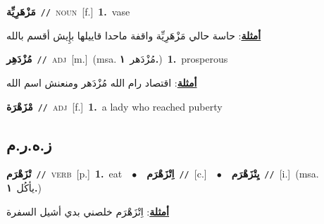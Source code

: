 \documentclass[10pt,a4paper,twoside]{article} %
\begin{document}
\begin{multicols}{2}
{\setlength\topsep{0pt}\textbf{\foreignlanguage{arabic}{مَزْهَرِيِّة}}\ {\color{gray}\texttt{//}\color{black}}\ \textsc{noun}\ [f.]\ \textbf{1.}~vase\  \begin{flushright}\color{gray}\foreignlanguage{arabic}{\textbf{\underline{\foreignlanguage{arabic}{أمثلة}}}: حاسة حالي مَزْهَرِيِّة واقفة ماحدا قاييلها بإِيش أقسم بالله}\end{flushright}\color{black}} \vspace{2mm}

{\setlength\topsep{0pt}\textbf{\foreignlanguage{arabic}{مُزْدَهِر}}\ {\color{gray}\texttt{//}\color{black}}\ \textsc{adj}\ [m.]\ \color{gray}(msa. \foreignlanguage{arabic}{مُزْدَهر}~\foreignlanguage{arabic}{\textbf{١.}})\color{black}\ \textbf{1.}~prosperous\  \begin{flushright}\color{gray}\foreignlanguage{arabic}{\textbf{\underline{\foreignlanguage{arabic}{أمثلة}}}: اقتصاد رام الله مُزْدَهر ومنعنش اسم الله}\end{flushright}\color{black}} \vspace{2mm}

{\setlength\topsep{0pt}\textbf{\foreignlanguage{arabic}{مْزَهْرَة}}\ {\color{gray}\texttt{//}\color{black}}\ \textsc{adj}\ [f.]\ \textbf{1.}~a lady who reached puberty\ } \vspace{2mm}

\vspace{-3mm}
\subsection*{\color{blue}\foreignlanguage{arabic}{ز.ه.ر.م}\color{blue}{}} 

{\setlength\topsep{0pt}\textbf{\foreignlanguage{arabic}{تْزَهْرَم}}\ {\color{gray}\texttt{//}\color{black}}\ \textsc{verb}\ [p.]\ \textbf{1.}~eat\ \ $\bullet$\ \ \setlength\topsep{0pt}\textbf{\foreignlanguage{arabic}{اِتْزَهْرَم}}\ {\color{gray}\texttt{//}\color{black}}\ [c.]\ \ $\bullet$\ \ \setlength\topsep{0pt}\textbf{\foreignlanguage{arabic}{يِتْزَهْرَم}}\ {\color{gray}\texttt{//}\color{black}}\ [i.]\ \color{gray}(msa. \foreignlanguage{arabic}{يأكُل}~\foreignlanguage{arabic}{\textbf{١.}})\color{black}\  \begin{flushright}\color{gray}\foreignlanguage{arabic}{\textbf{\underline{\foreignlanguage{arabic}{أمثلة}}}: اِتْزَهْرَم خلصني بدي أشيل السفرة}\end{flushright}\color{black}} \vspace{2mm}


\end{multicols}
\end{document}
